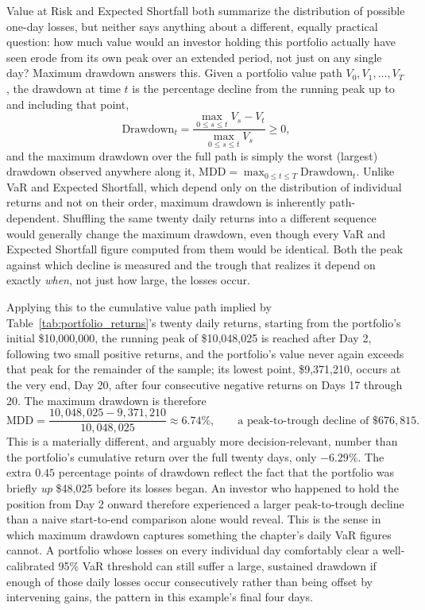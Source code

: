 \documentclass[../ai_in_finance]{subfiles}
\begin{document}
Value at Risk and Expected Shortfall both summarize the distribution of possible one-day losses, but neither says anything about a different, equally practical question: how much value would an investor holding this portfolio actually have seen erode from its own peak over an extended period, not just on any single day? Maximum drawdown answers this. Given a portfolio value path $V_0, V_1, \ldots, V_T$, the drawdown at time $t$ is the percentage decline from the running peak up to and including that point,
\begin{equation*}
\text{Drawdown}_t = \frac{\max_{0 \le s \le t} V_s - V_t}{\max_{0 \le s \le t} V_s} \ge 0,
\end{equation*}
and the maximum drawdown over the full path is simply the worst (largest) drawdown observed anywhere along it, $\text{MDD} = \max_{0\le t \le T} \text{Drawdown}_t$. Unlike VaR and Expected Shortfall, which depend only on the distribution of individual returns and not on their order, maximum drawdown is inherently path-dependent. Shuffling the same twenty daily returns into a different sequence would generally change the maximum drawdown, even though every VaR and Expected Shortfall figure computed from them would be identical. Both the peak against which decline is measured and the trough that realizes it depend on exactly \emph{when}, not just how large, the losses occur.

Applying this to the cumulative value path implied by Table~\ref{tab:portfolio_returns}'s twenty daily returns, starting from the portfolio's initial \$10,000,000, the running peak of \$10,048,025 is reached after Day 2, following two small positive returns, and the portfolio's value never again exceeds that peak for the remainder of the sample; its lowest point, \$9,371,210, occurs at the very end, Day 20, after four consecutive negative returns on Days 17 through 20. The maximum drawdown is therefore
\begin{equation*}
\text{MDD} = \frac{10{,}048{,}025 - 9{,}371{,}210}{10{,}048{,}025} \approx 6.74\%, \qquad \text{a peak-to-trough decline of } \$676{,}815.
\end{equation*}
This is a materially different, and arguably more decision-relevant, number than the portfolio's cumulative return over the full twenty days, only $-6.29\%$. The extra $0.45$ percentage points of drawdown reflect the fact that the portfolio was briefly \emph{up} \$48,025 before its losses began. An investor who happened to hold the position from Day 2 onward therefore experienced a larger peak-to-trough decline than a naive start-to-end comparison alone would reveal.
This is the sense in which maximum drawdown captures something the chapter's daily VaR figures cannot. A portfolio whose losses on every individual day comfortably clear a well-calibrated 95\% VaR threshold can still suffer a large, sustained drawdown if enough of those daily losses occur consecutively rather than being offset by intervening gains, the pattern in this example's final four days.
\end{document}

